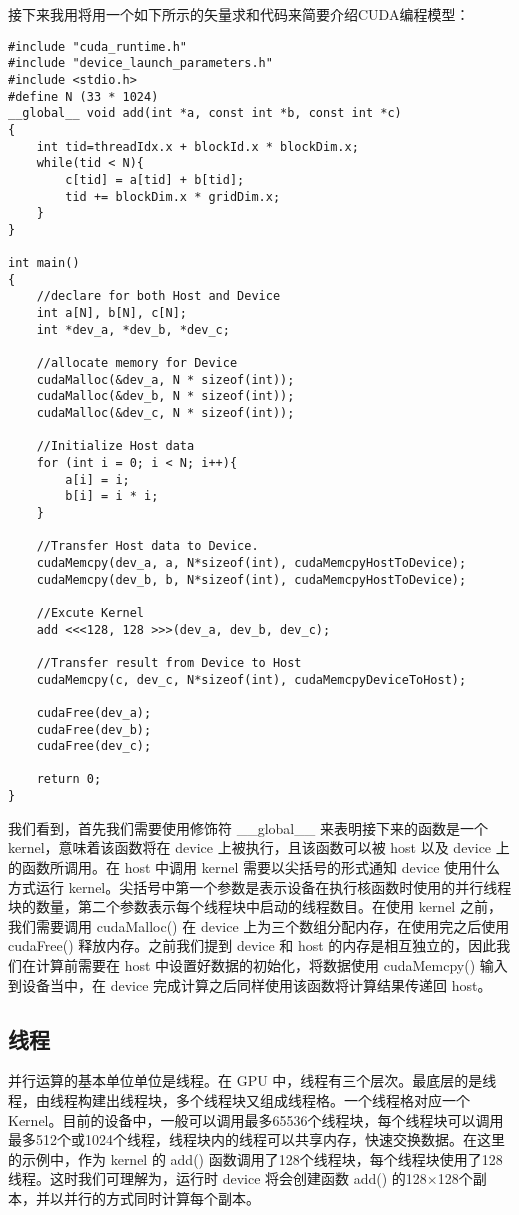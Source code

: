 接下来我用将用一个如下所示的矢量求和代码来简要介绍CUDA编程模型：

\begin{lstlisting}
#include "cuda_runtime.h"
#include "device_launch_parameters.h"
#include <stdio.h>
#define N (33 * 1024)
__global__ void add(int *a, const int *b, const int *c)
{
	int tid=threadIdx.x + blockId.x * blockDim.x;
	while(tid < N){
		c[tid] = a[tid] + b[tid];
		tid += blockDim.x * gridDim.x;
	}
}

int main()
{
	//declare for both Host and Device
	int a[N], b[N], c[N];
	int *dev_a, *dev_b, *dev_c;
	
	//allocate memory for Device
	cudaMalloc(&dev_a, N * sizeof(int));
	cudaMalloc(&dev_b, N * sizeof(int));
	cudaMalloc(&dev_c, N * sizeof(int));
	
	//Initialize Host data
	for (int i = 0; i < N; i++){
		a[i] = i;
		b[i] = i * i;
	}
	
	//Transfer Host data to Device.
	cudaMemcpy(dev_a, a, N*sizeof(int), cudaMemcpyHostToDevice);
	cudaMemcpy(dev_b, b, N*sizeof(int), cudaMemcpyHostToDevice);
	
	//Excute Kernel
	add <<<128, 128 >>>(dev_a, dev_b, dev_c);
	
	//Transfer result from Device to Host
	cudaMemcpy(c, dev_c, N*sizeof(int), cudaMemcpyDeviceToHost);
	
	cudaFree(dev_a);
	cudaFree(dev_b);
	cudaFree(dev_c);
	
	return 0;
}
\end{lstlisting}

我们看到，首先我们需要使用修饰符 \_\_global\_\_ 来表明接下来的函数是一个 kernel，意味着该函数将在 device 上被执行，且该函数可以被 host 以及 device 上的函数所调用。在 host 中调用 kernel 需要以尖括号的形式通知 device 使用什么方式运行 kernel。尖括号中第一个参数是表示设备在执行核函数时使用的并行线程块的数量，第二个参数表示每个线程块中启动的线程数目。在使用 kernel 之前，我们需要调用 cudaMalloc() 在 device 上为三个数组分配内存，在使用完之后使用 cudaFree() 释放内存。之前我们提到 device 和 host 的内存是相互独立的，因此我们在计算前需要在 host 中设置好数据的初始化，将数据使用 cudaMemcpy() 输入到设备当中，在 device 完成计算之后同样使用该函数将计算结果传递回 host。

\subsection{线程}

并行运算的基本单位单位是线程。在 GPU 中，线程有三个层次。最底层的是线程，由线程构建出线程块，多个线程块又组成线程格。一个线程格对应一个 Kernel。目前的设备中，一般可以调用最多65536个线程块，每个线程块可以调用最多512个或1024个线程，线程块内的线程可以共享内存，快速交换数据。在这里的示例中，作为 kernel 的 add() 函数调用了128个线程块，每个线程块使用了128线程。这时我们可理解为，运行时 device 将会创建函数 add() 的128$\times$128个副本，并以并行的方式同时计算每个副本。

